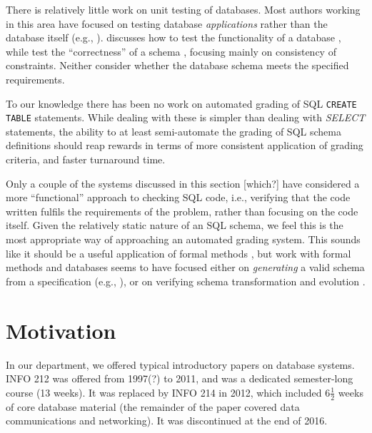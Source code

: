 \documentclass[sigconf, authordraft, capitalise]{acmart}
\begin{document}
There is relatively little work on unit testing of databases. Most authors working in this area have focused on testing database \emph{applications} rather than the database itself (e.g., \cite{Binnig.C-2008a-Multi-RQP,Chays.D-2008a-Query-based,Marcozzi.M-2012a-Test,Haller.K-2010a-Test}). \citeauthor{Ambler.S-2006a-Database} discusses how to test the functionality of a database \cite{Ambler.S-2006a-Database}, while \citeauthor{Farre.C-2008a-SVTe} test the ``correctness'' of a schema \cite{Farre.C-2008a-SVTe}, focusing mainly on consistency of constraints. Neither consider whether the database schema meets the specified requirements.

To our knowledge there has been no work on automated grading of SQL \texttt{CREATE TABLE} statements. While dealing with these is simpler than dealing with \emph{SELECT} statements, the ability to at least semi-automate the grading of SQL schema definitions should reap rewards in terms of more consistent application of grading criteria, and faster turnaround time.

Only a couple of the systems discussed in this section [which?] have considered a more ``functional'' approach to checking SQL code, i.e., verifying that the code written fulfils the requirements of the problem, rather than focusing on the code itself. Given the relatively static nature of an SQL schema, we feel this is the most appropriate way of approaching an automated grading system. This sounds like it should be a useful application of formal methods \cite{Spivey.J-1989a-An-introduction}, but work with formal methods and databases seems to have focused either on \emph{generating} a valid schema from a specification (e.g., \cite{Vatanawood.W-2004a-Formal,Lukovic.I-2003a-Proceedings,Choppella.V-2006a-Constructing}), or on verifying schema transformation and evolution \cite{Bench-Capon.T-1998a-Report}.


\section{Motivation}
\label{sec-motivation}

In our department, we offered typical introductory papers on database systems. INFO 212 was offered from 1997(?) to 2011, and was a dedicated semester-long course (13 weeks). It was replaced by INFO 214 in 2012, which included 6\(\frac{1}{2}\) weeks of core database material (the remainder of the paper covered data communications and networking). It was discontinued at the end of 2016.
\end{document}

